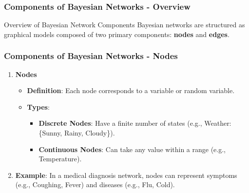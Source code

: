 \documentclass[aspectratio=169]{beamer}
\begin{document}
\begin{frame}[fragile]
    \frametitle{Components of Bayesian Networks - Overview}
    \begin{block}{Overview of Bayesian Network Components}
        Bayesian networks are structured as graphical models composed of two primary components: \textbf{nodes} and \textbf{edges}. 
    \end{block}
\end{frame}

\begin{frame}[fragile]
    \frametitle{Components of Bayesian Networks - Nodes}
    \begin{enumerate}
        \item \textbf{Nodes}
        \begin{itemize}
            \item \textbf{Definition}: Each node corresponds to a variable or random variable. 
            \item \textbf{Types}:
            \begin{itemize}
                \item \textbf{Discrete Nodes}: Have a finite number of states (e.g., Weather: \{Sunny, Rainy, Cloudy\}).
                \item \textbf{Continuous Nodes}: Can take any value within a range (e.g., Temperature).
            \end{itemize}
        \end{itemize}
        \item \textbf{Example}: In a medical diagnosis network, nodes can represent symptoms (e.g., Coughing, Fever) and diseases (e.g., Flu, Cold).
    \end{enumerate}
\end{frame}
\end{document}
